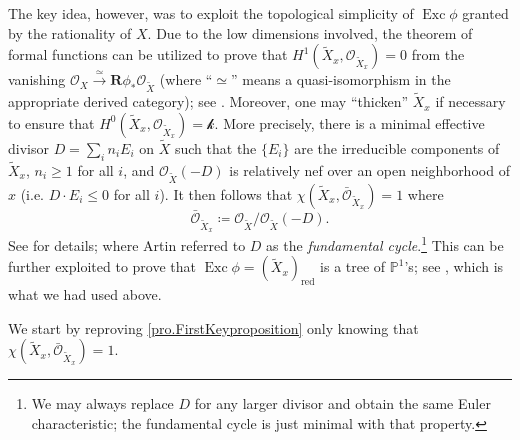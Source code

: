 \documentclass[12pt]{amsart}
\theoremstyle{plain}   %
\theoremstyle{definition}    %
\theoremstyle{remark}    %
\numberwithin{equation}{theorem}
\DeclareMathOperator{\Exc}{{Exc}}
\newcommand{\kay}{\mathcal{k}}
\newcommand{\sO}{\mathcal{O}}
\newcommand{\bP}{\mathbb{P}}
\begin{document}
The key idea, however, was to exploit the topological simplicity of $\Exc \phi$ granted by the rationality of $X$. Due to the low dimensions involved, the theorem of formal functions can be utilized to prove that $H^1(\tilde{X}_x, \sO_{\tilde{X}_x}) = 0$ from the vanishing $\sO_X \xrightarrow{\simeq}\mathbf{R} \phi_* \sO_{\tilde{X}}$ (where ``$\simeq$'' means a quasi-isomorphism in the appropriate derived category); see \cite{ArtinOnIsolatedRationalSingularities}. Moreover, one may ``thicken'' $\tilde{X}_x$ if necessary to ensure that $H^0(\tilde{X}_x, \sO_{\tilde{X}_x}) = \kay$. More precisely, there is a minimal effective divisor $D=\sum_i n_i E_i$ on $\tilde{X}$ such that the $\{E_i\}$ are the irreducible components of $\tilde{X}_x$, $n_i \geq 1$ for all $i$, and $\sO_{\tilde{X}}(-D)$ is relatively nef over an open neighborhood of $x$ (i.e. $D\cdot E_i \leq 0$ for all $i$). It then follows that $\chi(\tilde{X}_x, \bar{\sO}_{\tilde{X}_x})=1$ where
\[
\bar{\sO}_{\tilde{X}_x} \coloneqq \sO_{\tilde{X}}/\sO_{\tilde{X}}(-D).
\]
See \cite{ArtinOnIsolatedRationalSingularities} for details; where Artin referred to $D$ as the \emph{fundamental cycle}.\footnote{We may always replace $D$ for any larger divisor and obtain the same Euler characteristic; the fundamental cycle is just minimal with that property.} This can be further exploited to prove that $\Exc \phi = (\tilde{X}_x)_{\mathrm{red}}$ is a tree of $\bP^1$'s; see \cite{LipmanRationalSingularities,EsnaultViehwegSurfaceSingularitiesDominatedSmoothVarieties}, which is what we had used above. 

We start by reproving \autoref{pro.FirstKeyproposition} only knowing that $\chi(\tilde{X}_x, \bar{\sO}_{\tilde{X}_x}) = 1$. 
\end{document}
